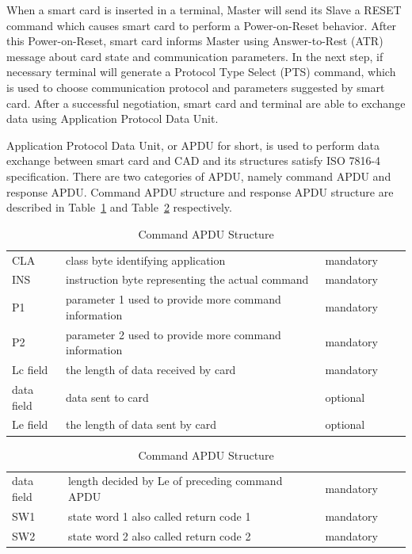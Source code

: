 When a smart card is inserted in a terminal, Master will send its Slave a RESET command which causes smart card to perform a Power-on-Reset behavior. After this Power-on-Reset, smart card informs Master using Answer-to-Rest (ATR) message about card state and communication parameters. In the next step, if necessary terminal will generate a Protocol Type Select (PTS) command, which is used to choose communication protocol and parameters suggested by smart card. After a successful negotiation, smart card and terminal are able to exchange data using Application Protocol Data Unit.
  
Application Protocol Data Unit, or APDU for short, is used  to perform data exchange between smart card and CAD and its structures satisfy ISO 7816-4 specification\cite{chen}. There are two categories of APDU, namely command APDU and response APDU. Command APDU structure and response APDU structure are described in Table~\ref{table:capdu} and Table~\ref{table:rapdu} respectively\cite{handbuch}. 

\begin{table}[!htbp]
\caption{Command APDU Structure}
\centering
\begin{tabular}{lllll}
\hline\hline
 CLA &class byte identifying application  & mandatory \\[0.5ex]
 INS &instruction byte representing the actual command  & mandatory \\
 P1 &parameter 1 used to provide more command information & mandatory \\
 P2 &parameter 2 used to provide more command information& mandatory \\
 Lc field &the length of data received by card & mandatory \\
 data field &data sent to card& optional \\
Le field &the length of data sent by card& optional \\
\hline
\end{tabular}
\label{table:capdu}
\end{table}

\begin{table}[ht]
\caption{Command APDU Structure}
\centering
\begin{tabular}{lllll}
\hline\hline
 data field & length decided by Le of preceding command  APDU  & mandatory \\[0.5ex]
 SW1 &state word 1 also called return code 1  & mandatory \\
 SW2 &state word 2 also called return code 2& mandatory \\
\hline
\end{tabular}
\label{table:rapdu}
\end{table}

